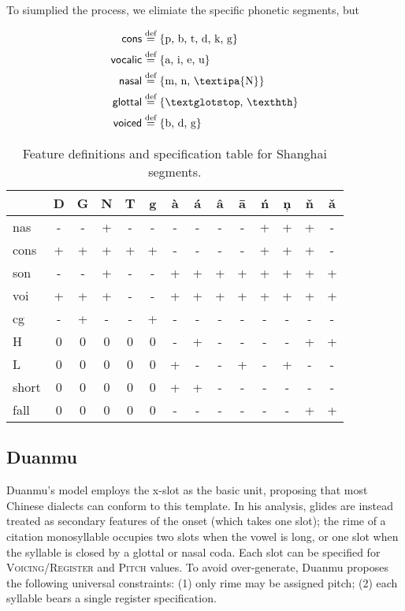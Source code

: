 \documentclass[11pt]{article}
\begin{document}
To siumplied the process, we elimiate the specific phonetic segments, but 

\begin{table}[h!]
	\centering
	\begin{minipage}{0.25\textwidth}
		\begin{align*}
			\textsf{cons} &\stackrel{\text{def}}{=} \{\text{p, b, t, d, k, g}\}\\
			\textsf{vocalic} &\stackrel{\text{def}}{=} \{\text{a, i, e, u}\}\\
			\textsf{nasal} &\stackrel{\text{def}}{=} \{\text{m, n, \textipa{N}}\}\\
			\textsf{glottal} &\stackrel{\text{def}}{=} \{\text{\textglotstop, \texthth}\}\\
			\textsf{voiced} &\stackrel{\text{def}}{=} \{\text{b, d, g}\}
		\end{align*}
	\end{minipage}
	\hfill
	\begin{minipage}{0.7\textwidth}
		\centering
		\begin{tabular}{lccccccccccccc}
			\hline
			& D & G & N & T & g & \`{a} & \'{a} & \^{a} & \={a} & \'{n} & \c{n} & \v{n} & \v{a} \\
			\hline
			nas   & - & - & + & - & - & - & - & - & - & + & + & + & - \\
			cons  & + & + & + & + & + & - & - & - & - & + & + & + & - \\
			son   & - & - & + & - & - & + & + & + & + & + & + & + & + \\
			voi   & + & + & + & - & - & + & + & + & + & + & + & + & + \\
			cg    & - & + & - & - & + & - & - & - & - & - & - & - & - \\
			H     & 0 & 0 & 0 & 0 & 0 & - & + & - & - & - & - & + & + \\
			L     & 0 & 0 & 0 & 0 & 0 & + & - & - & + & - & + & - & - \\
			short & 0 & 0 & 0 & 0 & 0 & + & + & - & - & - & - & - & - \\
			fall  & 0 & 0 & 0 & 0 & 0 & - & - & - & - & - & - & + & + \\
			\hline
		\end{tabular}
	\end{minipage}
	\caption{Feature definitions and specification table for Shanghai segments.}
\end{table}

\subsection{Duanmu}
Duanmu’s model employs the x-slot as the basic unit, proposing that most
Chinese dialects can conform to this template. In his analysis, glides 
are instead treated as secondary features of the onset (which takes one
slot); the rime of a citation monosyllable occupies two slots when the vowel
is long, or one slot when the syllable is closed by a glottal or nasal coda.
Each slot can be specified for \textsc{Voicing/Register} and \textsc{Pitch}
values. To avoid over-generate, Duanmu proposes the following universal
constraints: (1) only rime may be assigned pitch; (2) each syllable bears a 
single register specification. 
\end{document}
